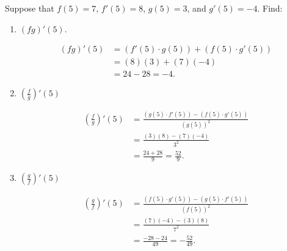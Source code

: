 \documentclass[nooutcomes]{ximera}
\begin{document}
\begin{problem}
Suppose that $f(5) = 7$, $f'(5) = 8$, $g(5) = 3$, and $g'(5) = -4$.  Find:

	\begin{enumerate}
	
	\item  $(fg)'(5)$.
		\begin{freeResponse}
		\begin{align*}
		(fg)'(5) &= (f'(5) \cdot g(5)) + (f(5) \cdot g'(5))  \\
		&= (8)(3) + (7)(-4)  \\
		&= 24 - 28 = -4.
		\end{align*}
		\end{freeResponse}
		
		
		
	\item $ \left( \frac{f}{g} \right)' (5)$
		\begin{freeResponse}
		\begin{align*}
		\left( \frac{f}{g} \right)' (5) &= \frac{(g(5) \cdot f'(5)) - (f(5) \cdot g'(5))}{(g(5))^2}  \\
		&= \frac{(3)(8) - (7)(-4)}{3^2}  \\
		&= \frac{24 + 28}{9} = \frac{52}{9}.
		\end{align*}
		\end{freeResponse}
		
		
		
	\item $ \left( \frac{g}{f} \right)' (5)$
		\begin{freeResponse}
		\begin{align*}
		\left( \frac{g}{f} \right)' (5) &= \frac{(f(5) \cdot g'(5)) - (g(5) \cdot f'(5))}{(f(5))^2}  \\
		&= \frac{(7)(-4) - (3)(8)}{7^2}  \\
		&= \frac{-28 - 24}{49} = - \frac{52}{49}.
		\end{align*}
		\end{freeResponse}
		
	
	
	\end{enumerate}
		
\end{problem}
\end{document}

